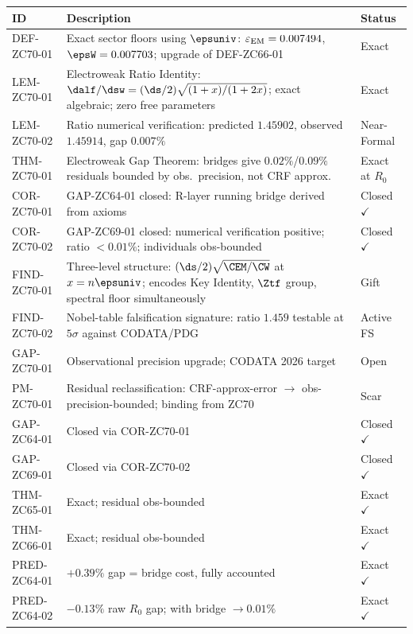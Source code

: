 \documentclass[12pt, a4paper]{article}
\renewcommand{\epsEM}{\varepsilon_{\rm EM}}
\begin{document}
\begin{formalbox}[title={Atomic Registry --- ZC70}]
\begin{center}
\renewcommand{\arraystretch}{1.3}
\small
\begin{tabular}{lp{7.8cm}l}
\toprule
ID & Description & Status \\
\midrule
DEF-ZC70-01
  & Exact sector floors using $\epsuniv$:
    $\epsEM = 0.007494$, $\epsW = 0.007703$;
    upgrade of DEF-ZC66-01
  & Exact \\[3pt]
LEM-ZC70-01
  & Electroweak Ratio Identity:
    $\dalf/\dsw = (\ds/2)\sqrt{(1+x)/(1+2x)}$;
    exact algebraic; zero free parameters
  & Exact \\[3pt]
LEM-ZC70-02
  & Ratio numerical verification:
    predicted $1.45902$, observed $1.45914$, gap $0.007\%$
  & Near-Formal \\[3pt]
THM-ZC70-01
  & Electroweak Gap Theorem: bridges give $0.02\%$/$0.09\%$
    residuals bounded by obs.\ precision, not CRF approx.
  & Exact at $R_0$ \\[3pt]
COR-ZC70-01
  & GAP-ZC64-01 closed: R-layer running bridge derived from axioms
  & Closed $\checkmark$ \\[3pt]
COR-ZC70-02
  & GAP-ZC69-01 closed: numerical verification positive;
    ratio $<0.01\%$; individuals obs-bounded
  & Closed $\checkmark$ \\[3pt]
FIND-ZC70-01
  & Three-level structure: $(\ds/2)\sqrt{\CEM/\CW}$ at $x=n\epsuniv$;
    encodes Key Identity, $\Ztf$ group, spectral floor simultaneously
  & Gift \\[3pt]
FIND-ZC70-02
  & Nobel-table falsification signature: ratio $1.459$
    testable at $5\sigma$ against CODATA/PDG
  & Active FS \\[3pt]
GAP-ZC70-01
  & Observational precision upgrade; CODATA 2026 target
  & Open \\[3pt]
PM-ZC70-01
  & Residual reclassification: CRF-approx-error $\to$
    obs-precision-bounded; binding from ZC70
  & Scar \\
\midrule
GAP-ZC64-01 & Closed via COR-ZC70-01 & Closed $\checkmark$ \\
GAP-ZC69-01 & Closed via COR-ZC70-02 & Closed $\checkmark$ \\
THM-ZC65-01 & Exact; residual obs-bounded & Exact $\checkmark$ \\
THM-ZC66-01 & Exact; residual obs-bounded & Exact $\checkmark$ \\
PRED-ZC64-01 & $+0.39\%$ gap = bridge cost, fully accounted & Exact $\checkmark$ \\
PRED-ZC64-02 & $-0.13\%$ raw $R_0$ gap; with bridge $\to 0.01\%$ & Exact $\checkmark$ \\
\bottomrule
\end{tabular}
\end{center}
\end{formalbox}
\end{document}
